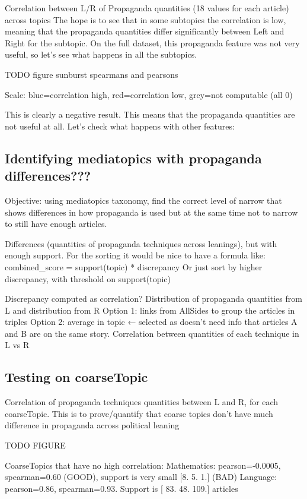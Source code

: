 Correlation between L/R of Propaganda quantities (18 values for each article) across topics
The hope is to see that in some subtopics the correlation is low, meaning that the propaganda quantities differ significantly between Left and Right for the subtopic.
On the full dataset, this propaganda feature was not very useful, so let’s see what happens in all the subtopics.

TODO figure sunburst spearmans and pearsons

Scale: blue=correlation high, red=correlation low, grey=not computable (all 0)

This is clearly a negative result. This means that the propaganda quantities are not useful at all. Let’s check what happens with other features:


\subsection{Identifying mediatopics with propaganda differences???}

Objective: using mediatopics taxonomy, find the correct level of narrow that shows differences in how propaganda is used but at the same time not to narrow to still have enough articles.

Differences (quantities of propaganda techniques across leanings), but with enough support. For the sorting it would be nice to have a formula like: 
combined\_score = support(topic) * discrepancy
Or just sort by higher discrepancy, with threshold on support(topic)

Discrepancy computed as correlation?
Distribution of propaganda quantities from L and distribution from R
Option 1: links from AllSides to group the articles in triples
Option 2: average in topic ← selected as doesn’t need info that articles A and B are on the same story. Correlation between quantities of each technique in L vs R

\subsection{Testing on coarseTopic}
Correlation of propaganda techniques quantities between L and R, for each coarseTopic. This is to prove/quantify that coarse topics don’t have much difference in propaganda across political leaning

TODO FIGURE

CoarseTopics that have no high correlation:
Mathematics: pearson=-0.0005, spearman=0.60 (GOOD), support is very small [8. 5. 1.] (BAD)
Language: pearson=0.86, spearman=0.93. Support is [ 83.  48. 109.] articles

